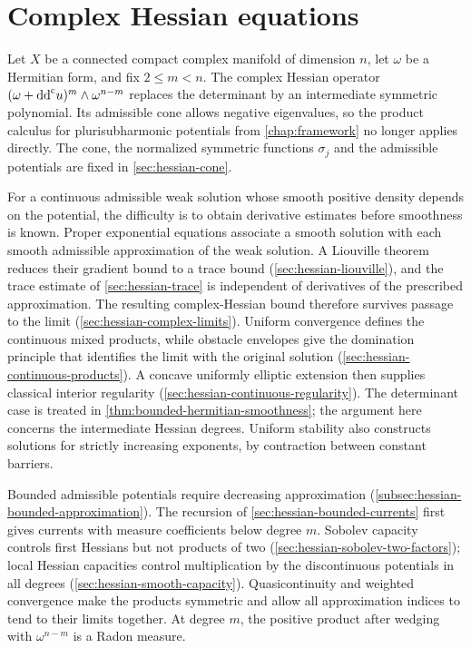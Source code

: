 \chapter{Complex Hessian equations}
\label{chap:hessian-equations}

Let $X$ be a connected compact complex manifold of dimension $n$,
let $\omega$ be a Hermitian form, and fix $2\leq m<n$.
The complex Hessian operator
$(\omega+\mathrm{dd}^{\mathrm{c}} u)^m\wedge\omega^{n-m}$ replaces the determinant by an
intermediate symmetric polynomial. Its admissible cone allows negative
eigenvalues, so the product calculus for plurisubharmonic potentials
from \cref{chap:framework} no longer applies directly. The cone, the
normalized symmetric functions $\sigma_j$ and the admissible
potentials are fixed in \cref{sec:hessian-cone}.

For a continuous admissible weak solution whose smooth positive density
depends on the potential, the difficulty is to obtain derivative
estimates before smoothness is known. Proper exponential equations
associate a smooth solution with each smooth admissible approximation
of the weak solution. A Liouville theorem reduces their gradient bound
to a trace bound (\cref{sec:hessian-liouville}), and the trace estimate
of \cref{sec:hessian-trace} is independent of derivatives of the
prescribed approximation. The resulting complex-Hessian bound therefore
survives passage to the limit (\cref{sec:hessian-complex-limits}).
Uniform convergence defines the continuous mixed products, while
obstacle envelopes give the domination principle that identifies the
limit with the original solution (\cref{sec:hessian-continuous-products}).
A concave uniformly elliptic extension then supplies classical interior
regularity (\cref{sec:hessian-continuous-regularity}). The determinant
case is treated in \cref{thm:bounded-hermitian-smoothness}; the argument
here concerns the intermediate Hessian degrees.
Uniform stability also constructs solutions for strictly increasing
exponents, by contraction between constant barriers.

Bounded admissible potentials require decreasing approximation
(\cref{subsec:hessian-bounded-approximation}). The recursion of
\cref{sec:hessian-bounded-currents} first gives currents with measure
coefficients below degree $m$. Sobolev capacity controls first
Hessians but not products of two
(\cref{sec:hessian-sobolev-two-factors}); local Hessian capacities
control multiplication by the discontinuous potentials in all degrees
(\cref{sec:hessian-smooth-capacity}).
Quasicontinuity and weighted convergence make the products symmetric
and allow all approximation indices to tend to their limits together.
At degree $m$, the positive product after wedging with $\omega^{n-m}$
is a Radon measure.


